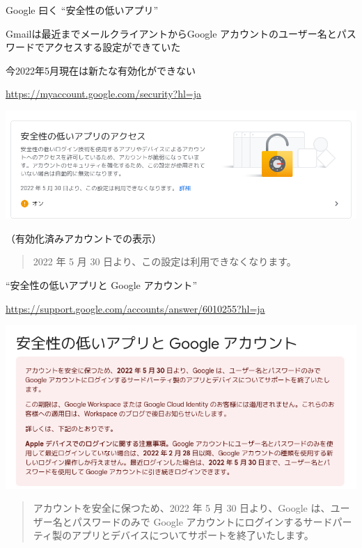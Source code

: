 \begin{frame}{Google 曰く ``安全性の低いアプリ''}

Gmailは最近までメールクライアントからGoogle アカウントのユーザー名とパスワードでアクセスする設定ができていた

今2022年5月現在は新たな有効化ができない

{\footnotesize\url{https://myaccount.google.com/security?hl=ja}}

\begin{center}
\includegraphics[width=0.9\hsize]{image202205/g-security-less.png}

（有効化済みアカウントでの表示）
\end{center}

\begin{quote}
2022 年 5 月 30 日より、この設定は利用できなくなります。
\end{quote}

\end{frame}

\begin{frame}{``安全性の低いアプリと Google アカウント''}

{\footnotesize\url{https://support.google.com/accounts/answer/6010255?hl=ja}}

\begin{center}
\includegraphics[width=0.8\hsize]{image202205/g-support-less.png}
\end{center}

\begin{quote}
アカウントを安全に保つため、2022 年 5 月 30 日より、Google は、ユーザー名とパスワードのみで Google アカウントにログインするサードパーティ製のアプリとデバイスについてサポートを終了いたします。
\end{quote}

\end{frame}

